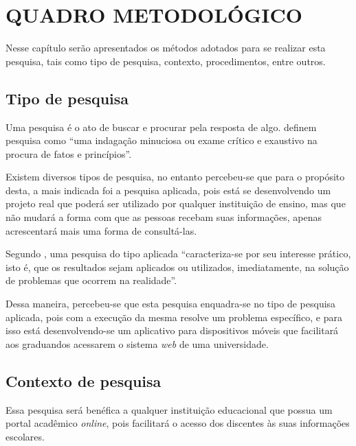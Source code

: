 \chapter{QUADRO METODOLÓGICO}

	\par Nesse capítulo serão apresentados os métodos adotados para se realizar esta
pesquisa, tais como tipo de pesquisa, contexto, procedimentos, entre outros.

\section{Tipo de pesquisa}
	
	\par Uma pesquisa é o ato de buscar e procurar pela resposta de algo.
 definem pesquisa como “uma indagação minuciosa
ou exame crítico e exaustivo na procura de fatos e princípios”.

	\par Existem diversos tipos de pesquisa, no entanto percebeu-se que para o
propósito desta, a mais indicada foi a pesquisa aplicada, pois está se
desenvolvendo um projeto real que poderá ser utilizado por qualquer instituição
de ensino, mas que não mudará a forma com que as pessoas recebam suas
informações, apenas acrescentará mais uma forma de consultá-las.

	\par Segundo , uma pesquisa do tipo aplicada
“caracteriza-se por seu interesse prático, isto é, que os resultados sejam
aplicados ou utilizados, imediatamente, na solução de problemas que ocorrem na
realidade”.

	\par Dessa maneira, percebeu-se que esta pesquisa enquadra-se no tipo de pesquisa
aplicada, pois com a execução da mesma resolve um problema específico, e para
isso está desenvolvendo-se um aplicativo para dispositivos móveis que facilitará aos
graduandos acessarem o sistema \textit{web} de uma universidade.

\section{Contexto de pesquisa}

	\par Essa pesquisa será benéfica a qualquer instituição educacional que possua
um portal acadêmico \textit{online}, pois facilitará o acesso dos discentes às suas
informações escolares.

